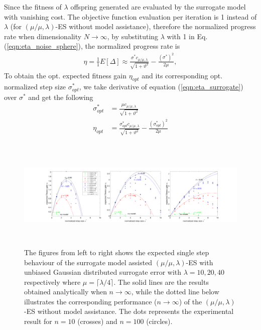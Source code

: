Since the fitness of $\lambda$ offspring generated are evaluated by the surrogate model with vanishing cost. The objective function evaluation per iteration is 1 instead of $\lambda$ (for $(\mu/\mu,\lambda)$-ES without model assistance), therefore the normalized progress rate when dimensionality $N \rightarrow \infty$, by substituting $\lambda$ with 1 in Eq. (\ref{eqn:eta_noise_sphere}), the normalized progress rate is 
\begin{align}\label{eqn:eta_surrogate}{}
\eta = \frac{1}{1}E[ \Delta] \approx  \frac{\sigma^* c_{\mu / \mu, \lambda}}{\sqrt {1+ \vartheta^2}} - \frac{(\sigma^*)^2}{2 \mu} ,
\end{align}
To obtain the opt. expected fitness gain $\eta_{opt}$ and its corresponding opt. normalized step size $\sigma^*_{opt}$, we take derivative of equation (\ref{eqn:eta_surrogate}) over $\sigma^*$ and get the following 
\begin{align}\label{eqn:opt_surrogate}
\sigma^*_{opt} &= \frac{ \mu c_{\mu / \mu, \lambda}}{\sqrt {1+ \vartheta^2}}\\
\eta_{opt} &= \frac{\sigma^*_{opt} c_{\mu / \mu, \lambda}}{\sqrt {1+ \vartheta^2}} - \frac{(\sigma^*_{opt})^2}{2 \mu} 
\end{align}

\begin{center}
\begin{figure}
\includegraphics[height=2.1in, width=6.0in]{expectedFitGain_v2}
\caption{The figures from left to right shows the expected single step behaviour of the surrogate model assisted $(\mu/\mu,\lambda)$-ES with unbiased Gaussian distributed surrogate error with $\lambda=10,20,40$ respectively where $\mu = \lceil \lambda/4 \rceil$. The solid lines are the results obtained analytically when $n \rightarrow \infty$, while the dotted line below illustrates the corresponding performance ($n\rightarrow \infty$) of the $(\mu/\mu,\lambda)$-ES without model assistance. The dots represents the experimental result for $n=10$ (crosses) and $n=100$ (circles).}
\label{fig:expectedFitGain}
\end{figure}
\end{center}

